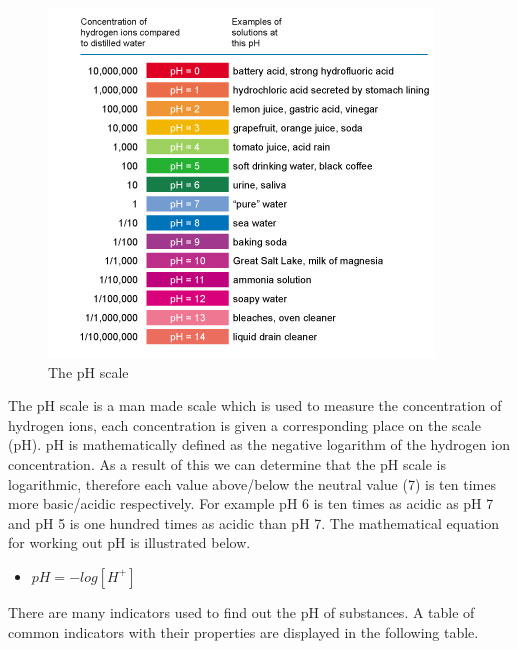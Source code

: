 \begin{figure}[H]
    \includegraphics[width=\textwidth]{./Planning/Images/pHScale.jpg}
    \caption{The pH scale} \label{fig:pH Scale}
\end{figure}

The pH scale is a man made scale which is used to measure the concentration of hydrogen ions, each concentration is given a corresponding place on the scale (pH). pH is mathematically defined as the negative logarithm of the hydrogen ion concentration. As a result of this we can determine that the pH scale is logarithmic, therefore each value above/below the neutral value (7) is ten times more basic/acidic respectively. For example pH 6 is ten times as acidic as pH 7  and pH 5 is one hundred times as acidic than pH 7. The mathematical equation for working out pH is illustrated below.

\begin{itemize}
\item $pH = - log [H^+]$
\end{itemize}

There are many indicators used to find out the pH of substances. A table of common indicators with their properties are displayed in the following table.

